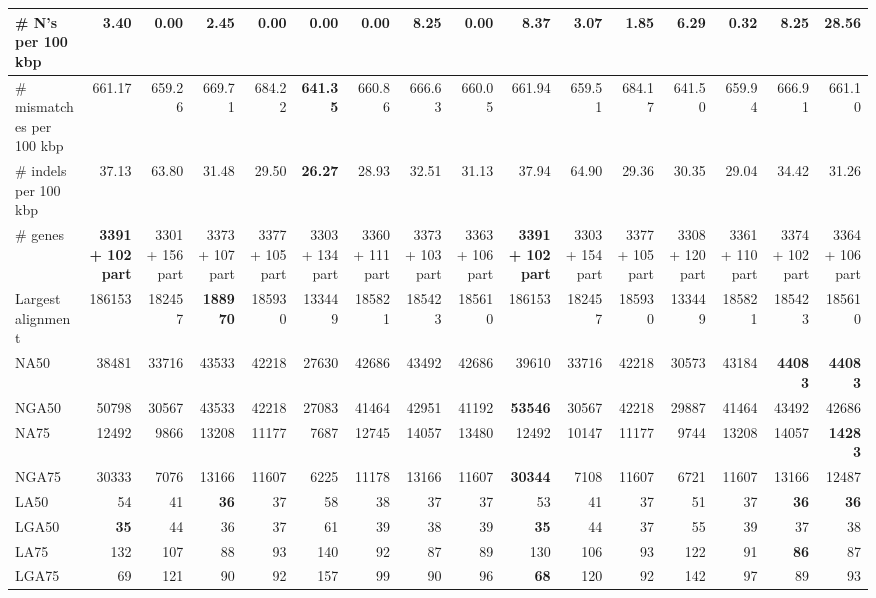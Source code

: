 \documentclass[12pt,a4paper]{article}
\begin{document}
\begin{table}[ht]
\begin{center}
\begin{tabular}{|l*{15}{|r}|}
\# N's per 100 kbp & 3.40 & {\bf 0.00} & 2.45 & {\bf 0.00} & {\bf 0.00} & {\bf 0.00} & 8.25 & {\bf 0.00} & 8.37 & 3.07 & 1.85 & 6.29 & 0.32 & 8.25 & 28.56 \\ \hline
\# mismatches per 100 kbp & 661.17 & 659.26 & 669.71 & 684.22 & {\bf 641.35} & 660.86 & 666.63 & 660.05 & 661.94 & 659.51 & 684.17 & 641.50 & 659.94 & 666.91 & 661.10 \\ \hline
\# indels per 100 kbp & 37.13 & 63.80 & 31.48 & 29.50 & {\bf 26.27} & 28.93 & 32.51 & 31.13 & 37.94 & 64.90 & 29.36 & 30.35 & 29.04 & 34.42 & 31.26 \\ \hline
\# genes & {\bf 3391 + 102 part} & 3301 + 156 part & 3373 + 107 part & 3377 + 105 part & 3303 + 134 part & 3360 + 111 part & 3373 + 103 part & 3363 + 106 part & {\bf 3391 + 102 part} & 3303 + 154 part & 3377 + 105 part & 3308 + 120 part & 3361 + 110 part & 3374 + 102 part & 3364 + 106 part \\ \hline
Largest alignment & 186153 & 182457 & {\bf 188970} & 185930 & 133449 & 185821 & 185423 & 185610 & 186153 & 182457 & 185930 & 133449 & 185821 & 185423 & 185610 \\ \hline
NA50 & 38481 & 33716 & 43533 & 42218 & 27630 & 42686 & 43492 & 42686 & 39610 & 33716 & 42218 & 30573 & 43184 & {\bf 44083} & {\bf 44083} \\ \hline
NGA50 & 50798 & 30567 & 43533 & 42218 & 27083 & 41464 & 42951 & 41192 & {\bf 53546} & 30567 & 42218 & 29887 & 41464 & 43492 & 42686 \\ \hline
NA75 & 12492 & 9866 & 13208 & 11177 & 7687 & 12745 & 14057 & 13480 & 12492 & 10147 & 11177 & 9744 & 13208 & 14057 & {\bf 14283} \\ \hline
NGA75 & 30333 & 7076 & 13166 & 11607 & 6225 & 11178 & 13166 & 11607 & {\bf 30344} & 7108 & 11607 & 6721 & 11607 & 13166 & 12487 \\ \hline
LA50 & 54 & 41 & {\bf 36} & 37 & 58 & 38 & 37 & 37 & 53 & 41 & 37 & 51 & 37 & {\bf 36} & {\bf 36} \\ \hline
LGA50 & {\bf 35} & 44 & 36 & 37 & 61 & 39 & 38 & 39 & {\bf 35} & 44 & 37 & 55 & 39 & 37 & 38 \\ \hline
LA75 & 132 & 107 & 88 & 93 & 140 & 92 & 87 & 89 & 130 & 106 & 93 & 122 & 91 & {\bf 86} & 87 \\ \hline
LGA75 & 69 & 121 & 90 & 92 & 157 & 99 & 90 & 96 & {\bf 68} & 120 & 92 & 142 & 97 & 89 & 93 \\ \hline
\end{tabular}
\end{center}
\end{table}
\end{document}
